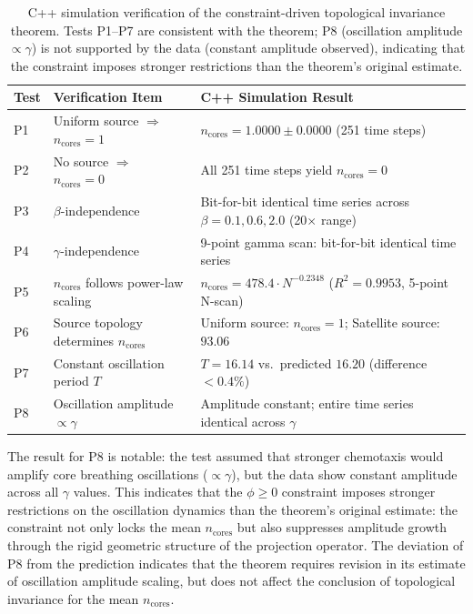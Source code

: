 \documentclass[sn-nature,pdflatex]{sn-jnl}
\begin{document}
\begin{table}[htbp]
\centering
\caption{C++ simulation verification of the constraint-driven topological invariance theorem. Tests P1--P7 are consistent with the theorem; P8 (oscillation amplitude $\propto \gamma$) is not supported by the data (constant amplitude observed), indicating that the constraint imposes stronger restrictions than the theorem's original estimate.}
\label{tab:predictions}
\begin{tabular}{lll}
\toprule
\textbf{Test} & \textbf{Verification Item} & \textbf{C++ Simulation Result} \\
\midrule
P1 & Uniform source $\Rightarrow$ $n_{\text{cores}}=1$ & $n_{\text{cores}} = 1.0000 \pm 0.0000$ (251 time steps) \\
P2 & No source $\Rightarrow$ $n_{\text{cores}}=0$ & All 251 time steps yield $n_{\text{cores}}=0$ \\
P3 & $\beta$-independence & Bit-for-bit identical time series across $\beta=0.1,0.6,2.0$ (20$\times$ range) \\
P4 & $\gamma$-independence & 9-point gamma scan: bit-for-bit identical time series \\
P5 & $n_{\text{cores}}$ follows power-law scaling & $n_{\text{cores}} = 478.4 \cdot N^{-0.2348}$ ($R^2=0.9953$, 5-point N-scan) \\
P6 & Source topology determines $n_{\text{cores}}$ & Uniform source: $n_{\text{cores}}=1$; Satellite source: $93.06$ \\
P7 & Constant oscillation period $T$ & $T=16.14$ vs.\ predicted $16.20$ (difference $<0.4\%$) \\
P8 & Oscillation amplitude $\propto \gamma$ & Amplitude constant; entire time series identical across $\gamma$ \\
\bottomrule
\end{tabular}
\end{table}

The result for P8 is notable: the test assumed that stronger chemotaxis would amplify core breathing oscillations ($\propto \gamma$), but the data show constant amplitude across all $\gamma$ values. This indicates that the $\phi \ge 0$ constraint imposes stronger restrictions on the oscillation dynamics than the theorem's original estimate: the constraint not only locks the mean $n_{\text{cores}}$ but also suppresses amplitude growth through the rigid geometric structure of the projection operator. The deviation of P8 from the prediction indicates that the theorem requires revision in its estimate of oscillation amplitude scaling, but does not affect the conclusion of topological invariance for the mean $n_{\text{cores}}$.
\end{document}

